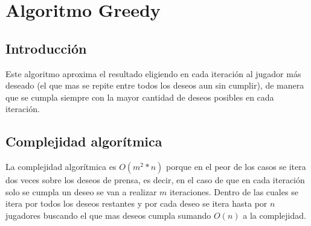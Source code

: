 \documentclass{estilo}
\begin{document}
% 
% 
% 
% 
% 
% 
% 
% 
% 
% 
% 
% 


\newpage

\section{Algoritmo Greedy}

\subsection{Introducción}

Este algoritmo aproxima el resultado eligiendo en cada iteración al jugador más deseado (el que mas se repite entre todos los deseos aun sin cumplir), de manera que se cumpla siempre con la mayor cantidad de deseos posibles en cada iteración.

\subsection{Complejidad algorítmica}

La complejidad algorítmica es $O(m^2 * n)$ porque en el peor de los casos se itera dos veces sobre los deseos de prensa, es decir, en el caso de que en cada iteración solo se cumpla un deseo se van a realizar $m$ iteraciones. Dentro de las cuales se itera por todos los deseos restantes y por cada deseo se itera hasta por $n$ jugadores buscando el que mas deseos cumpla sumando $O(n)$ a la complejidad.
\end{document}
